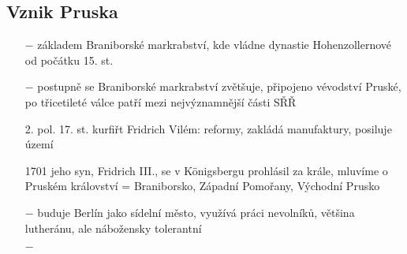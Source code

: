 \documentclass{article}
\begin{document}
\subsection*{Vznik Pruska}
\begin{itemize}
    \vspace{-0.5em}
    \setlength\itemsep{0.15em}
    \item[$-$] základem Braniborské markrabství, kde vládne dynastie Hohenzollernové od počátku 15. st.
    \item[$-$] postupně se Braniborské markrabství zvětšuje, připojeno vévodství Pruské, po třicetileté válce patří mezi nejvýznamnější části SŘŘ
    \item[2. pol. 17. st.] kurfiřt Fridrich Vilém: reformy, zakládá manufaktury, posiluje území
    \item[1701] jeho syn, Fridrich III., se v Königsbergu prohlásil za krále, mluvíme o Pruském království = Braniborsko, Západní Pomořany, Východní Prusko
    \item[$-$] buduje Berlín jako sídelní město, využívá práci nevolníků, většina lutheránu, ale nábožensky tolerantní
    \item[$-$] 
\end{itemize}
\end{document}

